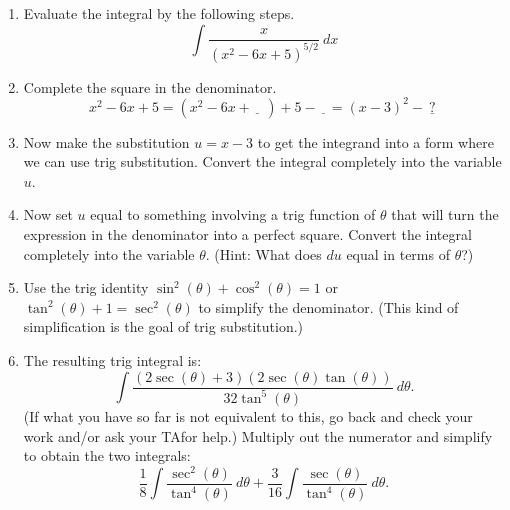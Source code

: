 \documentclass[12pt]{article}
\begin{document}
\begin{enumerate}
\begin{enumerate}

\end{enumerate}




\newpage
\item Evaluate the integral by the following steps.
\[\displaystyle\int  \frac{x}{(x^2-6x+5)^{5/2}} \ dx\]
\item Complete the square in the denominator.
\[x^2-6x+5 =(x^2-6x+\underline{~~~} \ )+5-\underline{~~~}=(x-3)^2-\underline{~?~}
\]
\vspace{1in}

\item Now make the substitution $u=x-3$ to get the integrand into a form where we can use trig substitution. Convert the integral completely into the variable $u$.

\vspace{1.25in}

\item Now set $u$ equal to something involving a trig function of $\theta$ that will turn the expression in the denominator into a perfect square.
Convert the integral completely into the variable $\theta$. (Hint: What does $du$ equal in terms of $\theta$?) 

\vspace{1.25in}
\item Use the trig identity $\sin^2(\theta) + \cos^2(\theta) = 1$ or $\tan^2(\theta)+1=\sec^2(\theta)$ to simplify the denominator. (This kind of simplification is the goal of trig substitution.)

\vspace{2in}

\item The resulting trig integral is: \[\displaystyle\int  \frac{(2\sec(\theta)+3)(2\sec(\theta)\tan(\theta))}{32\tan^5(\theta)} \ d\theta.\] (If what you have so far is not equivalent to this, go back and check your work and/or ask your TAfor help.) Multiply out the numerator and simplify to obtain the two integrals: \[\displaystyle\frac{1}{8}\displaystyle\int  \frac{\sec^2(\theta)}{\tan^4(\theta)} \ d\theta + \frac{3}{16}\displaystyle\int\frac{\sec(\theta)}{\tan^4(\theta)} \ d\theta.\]


\end{enumerate}
\end{document}
